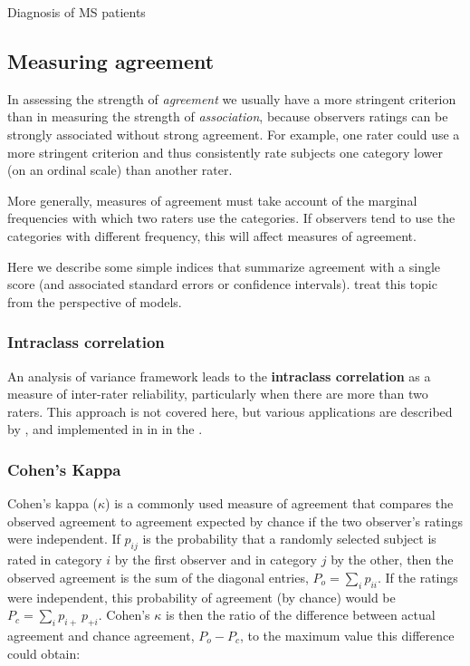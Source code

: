\documentclass[10pt,krantz2]{krantz}\usepackage[]{graphicx}\usepackage[]{color}
\begin{document}
\begin{Example}[MS1]{Diagnosis of MS patients}
%
\end{Example}

\subsection{Measuring agreement}\label{sec:agreemeas}
In assessing the strength of \emph{agreement} we usually have a more
stringent criterion than in measuring the strength of \emph{association},
because observers ratings can be strongly associated without strong agreement.
For example, one rater could use a more stringent criterion and thus consistently rate
subjects one category lower (on an ordinal scale) than another rater.

More generally, measures of agreement must take account of the
marginal frequencies with which two raters use the categories.
If observers tend to use the categories
with different frequency, this will affect measures of
agreement.

Here we describe some simple indices that summarize agreement with a
single score (and associated standard errors or confidence intervals).
\citet{vonEyeMun:2006} treat this topic from the perspective of
\loglin models.

\subsubsection{Intraclass correlation}
An analysis of variance framework leads to the {\bf intraclass correlation}
as a measure of inter-rater reliability, particularly when there are
more than two raters.
This approach is not covered here, but various applications are described
by \citet{ShroutFleiss:79}, and implemented in \R in 
in the .

\subsubsection{Cohen's Kappa}

Cohen's kappa (\(\kappa\))
\citep{Cohen:60,Cohen:68} is a commonly used measure of agreement that
compares the observed agreement to agreement expected by chance if the two observer's
ratings were independent.
If $p_{ij}$ is the probability that a randomly selected subject is
rated in category $i$ by the first observer and in category $j$ by
the other, then the observed agreement is the sum of the diagonal
entries,  \(P_o  = \sum_i p_{ii}\).  If the ratings were independent,
this probability of agreement (by chance) would be \(P_c = \sum_i p_{i+} \,  p_{+i}\).
Cohen's $\kappa$ is then the ratio of the difference between actual
agreement and chance agreement, $P_o - P_c$, to the maximum value
this difference could obtain:
\end{document}
